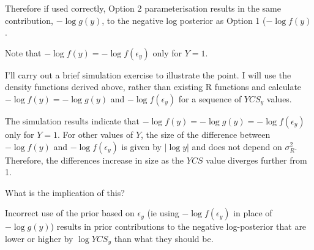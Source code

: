 \begin{appendices}
Therefore if used correctly, Option 2 parameterisation results in the
same contribution, \(-\log g(y)\), to the negative log posterior as
Option 1 (\(-\log f(y)\).

Note that \(-\log f(y)=-\log f(\epsilon_y)\) only for \(Y=1\).

I'll carry out a brief simulation exercise to illustrate the point. I
will use the density functions derived above, rather than existing R
functions and calculate \(-\log f(y) = -\log g(y)\) and
\(-\log f(\epsilon_y)\) for a sequence of \(YCS_y\) values.

The simulation results indicate that
\(-\log f(y) = -\log g(y) =-\log f(\epsilon_y)\) only for \(Y=1\). For
other values of \(Y\), the size of the difference between \(-\log f(y)\)
and \(-\log f(\epsilon_y)\) is given by \(\vert \log y\vert\) and does
not depend on \(\sigma^2_R\). Therefore, the differences increase in
size as the \(YCS\) value diverges further from 1.

What is the implication of this?

Incorrect use of the prior based on \(\epsilon_y\) (ie using
\(-\log f(\epsilon_y)\) in place of \(-\log g(y)\)) results in prior
contributions to the negative log-posterior that are lower or higher by
\(\log YCS_y\) than what they should be.
\end{appendices}
